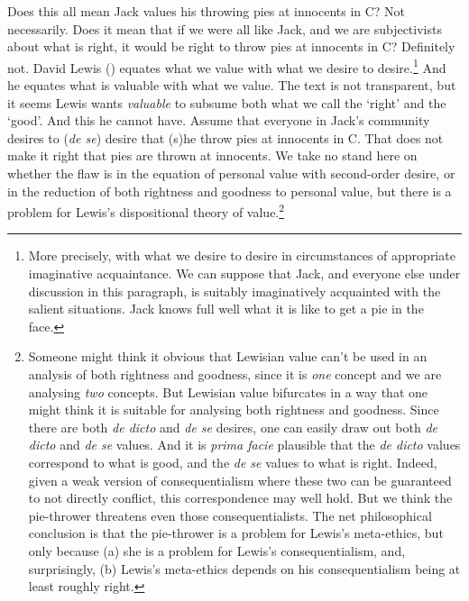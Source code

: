 \documentclass[
  11pt,
  letterpaper,
  DIV=11,
  numbers=noendperiod,
  twoside]{scrartcl}
\begin{document}
Does this all mean Jack values his throwing pies at innocents in C? Not
necessarily. Does it mean that if we were all like Jack, and we are
subjectivists about what is right, it would be right to throw pies at
innocents in C? Definitely not. David Lewis
() equates what we value with what we
desire to desire.\footnote{More precisely, with what we desire to desire
  in circumstances of appropriate imaginative acquaintance. We can
  suppose that Jack, and everyone else under discussion in this
  paragraph, is suitably imaginatively acquainted with the salient
  situations. Jack knows full well what it is like to get a pie in the
  face.} And he equates what is valuable with what we value. The text is
not transparent, but it seems Lewis wants \emph{valuable} to subsume
both what we call the `right' and the `good'. And this he cannot have.
Assume that everyone in Jack's community desires to (\emph{de se})
desire that (s)he throw pies at innocents in C. That does not make it
right that pies are thrown at innocents. We take no stand here on
whether the flaw is in the equation of personal value with second-order
desire, or in the reduction of both rightness and goodness to personal
value, but there is a problem for Lewis's dispositional theory of
value.\footnote{Someone might think it obvious that Lewisian value can't
  be used in an analysis of both rightness and goodness, since it is
  \emph{one} concept and we are analysing \emph{two} concepts. But
  Lewisian value bifurcates in a way that one might think it is suitable
  for analysing both rightness and goodness. Since there are both
  \emph{de dicto} and \emph{de se} desires, one can easily draw out both
  \emph{de dicto} and \emph{de se} values. And it is \emph{prima facie}
  plausible that the \emph{de dicto} values correspond to what is good,
  and the \emph{de se} values to what is right. Indeed, given a weak
  version of consequentialism where these two can be guaranteed to not
  directly conflict, this correspondence may well hold. But we think the
  pie-thrower threatens even those consequentialists. The net
  philosophical conclusion is that the pie-thrower is a problem for
  Lewis's meta-ethics, but only because (a) she is a problem for Lewis's
  consequentialism, and, surprisingly, (b) Lewis's meta-ethics depends
  on his consequentialism being at least roughly right.}
\end{document}
